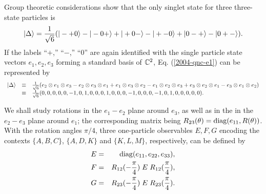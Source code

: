 \documentclass[pra,preprint,showpacs,showkeys,amsfonts]{revtex4}
\begin{document}
Group theoretic considerations \cite{2004-kasper-svo,kok-02}
show that the only singlet state for three three-state particles is
\begin{equation}
\vert \Delta \rangle
= {1\over \sqrt{6}}(
\vert - + 0\rangle
-
\vert - 0 +\rangle
+
\vert + 0 - \rangle
-
\vert + - 0\rangle
+
\vert 0 - + \rangle
-
\vert 0 + - \rangle
).
\label{2004-qnc-e1}
\end{equation}
If the labels
``$+$,''
``$-$,''
``$0$''
are again identified with the single particle state vectors
$e_1,e_2,e_3$ forming a standard basis of ${\Bbb C}^2$,
Eq. (\ref{2004-qnc-e1}) can be represented by
\begin{equation}
\begin{array}{ccl}
\vert \Delta \rangle
&\equiv& {1\over \sqrt{6}}(
 e_2 \otimes e_1 \otimes  e_3
-
 e_2 \otimes  e_3 \otimes  e_1
+
 e_1 \otimes  e_3 \otimes  e_2
-
 e_1 \otimes  e_2 \otimes  e_3
+
 e_3  \otimes e_2  \otimes e_1
-
 e_3 \otimes  e_1 \otimes  e_2
)
\\
&\equiv&
{1\over \sqrt{6}}
(0, 0, 0, 0, 0, -1, 0, 1, 0, 0, 0, 1, 0, 0, 0, -1, 0, 0, 0, -1, 0, 1, 0, 0, 0, 0, 0)
.
\end{array}
\label{2004-qnc-e1r}
\end{equation}



We shall study rotations in the $e_1-e_2$ plane around $e_3$,
 as well as in the in the $e_2-e_3$ plane around $e_1$; the corresponding matrix
being
$
R_{23}(\theta ) =  {\rm diag}(e_{11},R(\theta ))
$.
With the rotation angles $\pi /4$,
three one-particle observables $E,F,G$ encoding the contexts
$\{A,B,C\}$,
$\{A,D,K\}$ and
$\{K,L,M\}$, respectively,
can be defined by
\begin{eqnarray}
E &=&
{\rm diag}(e_{11},e_{22},e_{33}),
\label{2004-analog-Epiover43p1}
\\
F &=& R_{12}(-{\pi \over 4})\; E \; R_{12}({\pi \over 4})
,
\\
G &=& R_{23}(-{\pi \over 4})\; E \; R_{23}({\pi \over 4})
.
\label{2004-analog-Epiover4b3p1}
\end{eqnarray}
\end{document}
